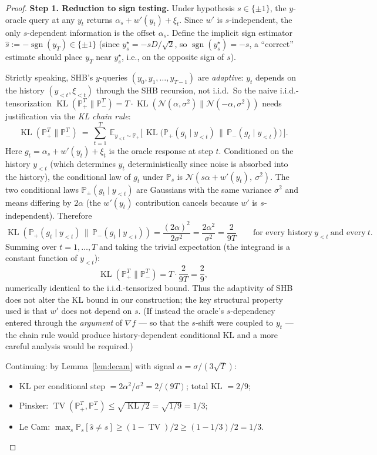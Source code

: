 \documentclass[11pt]{article}
\theoremstyle{definition}
\theoremstyle{remark}
\DeclareMathOperator{\KL}{KL}
\DeclareMathOperator{\TV}{TV}
\DeclareMathOperator{\sgn}{sgn}
\begin{document}
\begin{proof}
\textbf{Step 1. Reduction to sign testing.} Under hypothesis $s \in \{\pm 1\}$, the $y$-oracle query at any $y_t$ returns $\alpha_s + w'(y_t) + \xi_t$. Since $w'$ is $s$-independent, the only $s$-dependent information is the offset $\alpha_s$. Define the implicit sign estimator $\hat s := -\sgn(y_T) \in \{\pm 1\}$ (since $y^\star_s = -sD/\sqrt 2$, so $\sgn(y^\star_s) = -s$, a ``correct'' estimate should place $y_T$ near $y^\star_s$, i.e., on the opposite sign of $s$).

Strictly speaking, SHB's $y$-queries $(y_0, y_1, \ldots, y_{T-1})$ are \emph{adaptive}: $y_t$ depends on the history $(y_{<t}, \xi_{<t})$ through the SHB recursion, not i.i.d.\ So the naive i.i.d.-tensorization $\KL(\mathbb{P}_+^T \| \mathbb{P}_-^T) = T \cdot \KL(\mathcal{N}(\alpha,\sigma^2) \| \mathcal{N}(-\alpha, \sigma^2))$ needs justification via the \emph{KL chain rule}:
\[
  \KL(\mathbb{P}_+^T \| \mathbb{P}_-^T) \ =\ \sum_{t=1}^T\ \mathbb{E}_{y_{<t} \sim \mathbb{P}_+}\bigl[\,\KL\bigl(\mathbb{P}_+(g_t \mid y_{<t})\,\|\,\mathbb{P}_-(g_t \mid y_{<t})\bigr)\,\bigr].
\]
Here $g_t = \alpha_s + w'(y_t) + \xi_t$ is the oracle response at step $t$. Conditioned on the history $y_{<t}$ (which determines $y_t$ deterministically since noise is absorbed into the history), the conditional law of $g_t$ under $\mathbb{P}_s$ is $\mathcal{N}(s\alpha + w'(y_t),\ \sigma^2)$. The two conditional laws $\mathbb{P}_\pm(g_t \mid y_{<t})$ are Gaussians with the same variance $\sigma^2$ and means differing by $2\alpha$ (the $w'(y_t)$ contribution cancels because $w'$ is $s$-independent). Therefore
\[
  \KL(\mathbb{P}_+(g_t \mid y_{<t})\,\|\,\mathbb{P}_-(g_t \mid y_{<t})) = \frac{(2\alpha)^2}{2\sigma^2} = \frac{2\alpha^2}{\sigma^2} = \frac{2}{9T}\qquad\text{for every history}\ y_{<t}\ \text{and every}\ t.
\]
Summing over $t = 1, \ldots, T$ and taking the trivial expectation (the integrand is a constant function of $y_{<t}$):
\[
  \KL(\mathbb{P}_+^T \| \mathbb{P}_-^T) = T \cdot \frac{2}{9T} = \frac{2}{9},
\]
numerically identical to the i.i.d.-tensorized bound. Thus the adaptivity of SHB does not alter the KL bound in our construction; the key structural property used is that $w'$ does not depend on $s$. (If instead the oracle's $s$-dependency entered through the \emph{argument} of $\nabla f$ --- so that the $s$-shift were coupled to $y_t$ --- the chain rule would produce history-dependent conditional KL and a more careful analysis would be required.)

Continuing: by Lemma~\ref{lem:lecam} with signal $\alpha = \sigma/(3\sqrt T)$:
\begin{itemize}
\item KL per conditional step $= 2\alpha^2/\sigma^2 = 2/(9T)$; total KL $= 2/9$;
\item Pinsker: $\TV(\mathbb{P}_+^T, \mathbb{P}_-^T) \leq \sqrt{\KL/2} = \sqrt{1/9} = 1/3$;
\item Le Cam: $\max_s \mathbb{P}_s[\hat s \neq s] \geq (1 - \TV)/2 \geq (1 - 1/3)/2 = 1/3$.
\end{itemize}


\end{proof}
\end{document}
